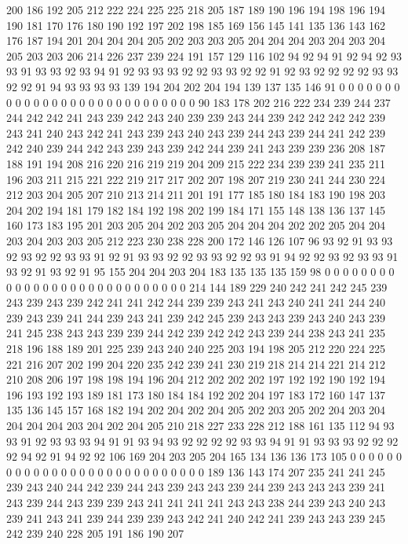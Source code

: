 200 186 192 205 212 222 224 225 225 218 205 187 189 190 196 194 198 196 194 190
181 170 176 180 190 192 197 202 198 185 169 156 145 141 135 136 143 162 176 187
194 201 204 204 204 205 202 203 203 205 204 204 204 203 204 203 204 205 203 203
206 214 226 237 239 224 191 157 129 116 102 94 92 94 91 92 94 92 93 93
91 93 93 92 93 94 91 92 93 93 93 92 92 93 93 92 92 91 92 93
92 92 92 92 93 93 92 92 91 94 93 93 93 93 139 194 204 202 204 194
139 137 135 146 91 0 0 0 0 0 0 0 0 0 0 0 0 0 0 0
0 0 0 0 0 0 0 0 0 0 0 0 0 90 183 178 202 216 222 234
239 244 237 244 242 242 241 243 239 242 243 240 239 239 243 244 239 242 242 242
242 239 243 241 240 243 242 241 243 239 243 240 243 239 244 243 239 244 241 242
239 242 240 239 244 242 243 239 243 239 242 244 239 241 243 239 239 236 208 187
188 191 194 208 216 220 216 219 219 204 209 215 222 234 239 239 241 235 211 196
203 211 215 221 222 219 217 217 202 207 198 207 219 230 241 244 230 224 212 203
204 205 207 210 213 214 211 201 191 177 185 180 184 183 190 198 203 204 202 194
181 179 182 184 192 198 202 199 184 171 155 148 138 136 137 145 160 173 183 195
201 203 205 204 202 203 205 204 204 204 202 202 205 204 204 203 204 203 203 205
212 223 230 238 228 200 172 146 126 107 96 93 92 91 93 93 92 93 92 92
93 93 91 92 91 93 93 92 92 93 93 92 92 93 91 94 92 92 93 92
93 93 91 93 92 91 93 92 91 95 155 204 204 203 204 183 135 135 135 159
98 0 0 0 0 0 0 0 0 0 0 0 0 0 0 0 0 0 0 0
0 0 0 0 0 0 0 0 0 214 144 189 229 240 242 241 242 245 239 243
239 243 239 242 241 241 242 244 239 239 243 241 243 240 241 241 244 240 239 243
239 241 244 239 243 241 239 242 245 239 243 243 239 243 240 243 239 241 245 238
243 243 239 239 244 242 239 242 242 243 239 244 238 243 241 235 218 196 188 189
201 225 239 243 240 240 225 203 194 198 205 212 220 224 225 221 216 207 202 199
204 220 235 242 239 241 230 219 218 214 214 221 214 212 210 208 206 197 198 198
194 196 204 212 202 202 202 197 192 192 190 192 194 196 193 192 193 189 181 173
180 184 184 192 202 204 197 183 172 160 147 137 135 136 145 157 168 182 194 202
204 202 204 205 202 203 205 202 204 203 204 204 204 204 203 204 202 204 205 210
218 227 233 228 212 188 161 135 112 94 93 93 91 92 93 93 93 94 91 91
93 94 93 92 92 92 92 93 93 94 91 91 93 93 93 92 92 92 92 94
92 91 94 92 92 106 169 204 203 205 204 165 134 136 136 173 105 0 0 0
0 0 0 0 0 0 0 0 0 0 0 0 0 0 0 0 0 0 0 0
0 0 0 0 0 189 136 143 174 207 235 241 241 245 239 243 240 244 242 239
244 243 239 243 243 239 244 239 243 243 243 239 241 243 239 244 243 239 239 243
241 241 241 241 243 243 238 244 239 243 240 243 239 241 243 241 239 244 239 239
243 242 241 240 242 241 239 243 243 239 245 242 239 240 228 205 191 186 190 207
